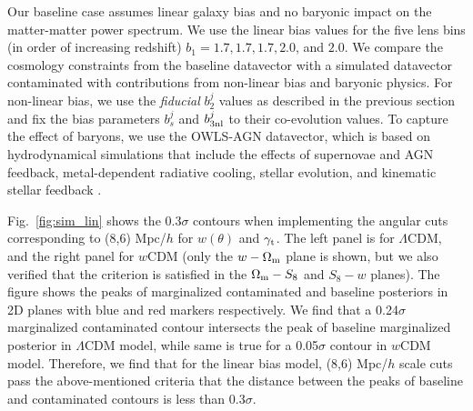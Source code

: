 \documentclass[aps, prd,twocolumn,superscriptaddress,nofootinbib,preprintnumbers]{revtex4-1}
\begin{document}

Our baseline case assumes linear galaxy bias and no baryonic impact on the matter-matter power spectrum. We use the linear bias values for the five lens bins (in order of increasing redshift) $b_1 = 1.7, 1.7, 1.7, 2.0$, and  $2.0$. We compare the cosmology constraints from the baseline datavector with a simulated datavector contaminated with contributions from non-linear bias and baryonic physics. For non-linear bias, we use the \textit{fiducial} $b^j_2$ values as described in the previous section and fix the bias parameters $b^j_s$ and $b^j_{\rm 3nl}$ to their co-evolution values. To capture the effect of baryons, we use the OWLS-AGN datavector, which is based on hydrodynamical simulations that include the effects of supernovae and AGN feedback, metal-dependent radiative cooling, stellar evolution, and kinematic stellar feedback \citep{Le_Brun_2014}. 

Fig.~\ref{fig:sim_lin} shows the 0.3$\sigma$ contours when implementing the angular cuts corresponding to (8,6) Mpc/$h$ for $w(\theta)$ and $\gamma_{\rm t}$. The left panel is for $\Lambda$CDM, and the right panel for $w$CDM (only the $w- \Omega_{\rm m}$ plane is shown, but we also verified that the criterion is satisfied in the $\Omega_{\rm m}-S_8$ and $S_8-w$  planes). The figure shows the peaks of marginalized contaminated and baseline posteriors in 2D planes with blue and red markers respectively. We find that a 0.24$\sigma$ marginalized contaminated contour intersects the peak of baseline marginalized posterior in $\Lambda$CDM model, while same is true for a 0.05$\sigma$ contour in $w$CDM model. Therefore, we find that for the linear bias model, (8,6) Mpc/$h$ scale cuts pass the above-mentioned criteria that the distance between the peaks of baseline and contaminated contours is less than 0.3$\sigma$.
\end{document}
